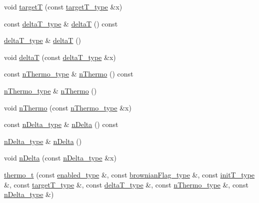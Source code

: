 \begin{DoxyCompactItemize}
\item 
void \hyperlink{classthermo__t_a0efcf3c1dae686f8c45e26148df3542b}{target\-T} (const \hyperlink{classthermo__t_a87b71140ee6bb1936aeed1d3b79a3596}{target\-T\-\_\-type} \&x)
\item 
const \hyperlink{classthermo__t_af616f20681b799198b8c97c235092181}{delta\-T\-\_\-type} \& \hyperlink{classthermo__t_afdb86658a55613b4666ffd5a48b7ebd4}{delta\-T} () const 
\item 
\hyperlink{classthermo__t_af616f20681b799198b8c97c235092181}{delta\-T\-\_\-type} \& \hyperlink{classthermo__t_a9bf5bcc2473807e26b42e211fb9bb31f}{delta\-T} ()
\item 
void \hyperlink{classthermo__t_af6e39c4c6c0140686995bb1852d05e1e}{delta\-T} (const \hyperlink{classthermo__t_af616f20681b799198b8c97c235092181}{delta\-T\-\_\-type} \&x)
\item 
const \hyperlink{classthermo__t_a37e4458c88caf30dc0257b65e5f2af94}{n\-Thermo\-\_\-type} \& \hyperlink{classthermo__t_ab9e8247db1cadc23580c27a0a1b768c2}{n\-Thermo} () const 
\item 
\hyperlink{classthermo__t_a37e4458c88caf30dc0257b65e5f2af94}{n\-Thermo\-\_\-type} \& \hyperlink{classthermo__t_a4e214b05fec430f5e6798a42261ff21f}{n\-Thermo} ()
\item 
void \hyperlink{classthermo__t_a028c387620565a248cd325753ca1def6}{n\-Thermo} (const \hyperlink{classthermo__t_a37e4458c88caf30dc0257b65e5f2af94}{n\-Thermo\-\_\-type} \&x)
\item 
const \hyperlink{classthermo__t_a814f5379ac544ebfdb16162514d961c1}{n\-Delta\-\_\-type} \& \hyperlink{classthermo__t_a8657ca0e255a05047a1fcf8d85860dd9}{n\-Delta} () const 
\item 
\hyperlink{classthermo__t_a814f5379ac544ebfdb16162514d961c1}{n\-Delta\-\_\-type} \& \hyperlink{classthermo__t_abb32968838d31fcc0fb3bdf87bf17b88}{n\-Delta} ()
\item 
void \hyperlink{classthermo__t_a7f774d8da1d510791ec3185cb3c4b23a}{n\-Delta} (const \hyperlink{classthermo__t_a814f5379ac544ebfdb16162514d961c1}{n\-Delta\-\_\-type} \&x)
\item 
\hyperlink{classthermo__t_a106c63228f15bef73116c97afc68e3e9}{thermo\-\_\-t} (const \hyperlink{classthermo__t_adf9ac04cf37c2de46153e42511aa24c2}{enabled\-\_\-type} \&, const \hyperlink{classthermo__t_a124b0a16394a6c7839596d1a8ba5c35b}{brownian\-Flag\-\_\-type} \&, const \hyperlink{classthermo__t_a29526c32fe31feb33a21833b0040dca7}{init\-T\-\_\-type} \&, const \hyperlink{classthermo__t_a87b71140ee6bb1936aeed1d3b79a3596}{target\-T\-\_\-type} \&, const \hyperlink{classthermo__t_af616f20681b799198b8c97c235092181}{delta\-T\-\_\-type} \&, const \hyperlink{classthermo__t_a37e4458c88caf30dc0257b65e5f2af94}{n\-Thermo\-\_\-type} \&, const \hyperlink{classthermo__t_a814f5379ac544ebfdb16162514d961c1}{n\-Delta\-\_\-type} \&)

\end{DoxyCompactItemize}
